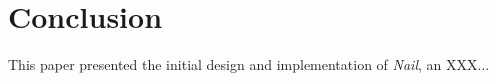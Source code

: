 \section{Conclusion}

This paper presented the initial design and implementation of
\textit{Nail}, an XXX...

